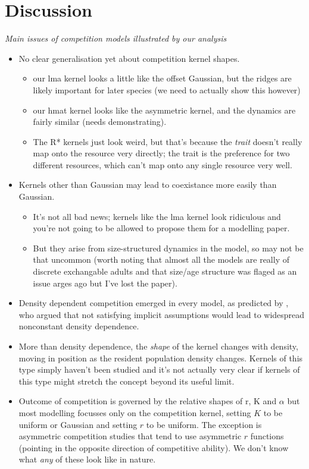 \documentclass[a4paper,11pt]{article}
\begin{document}
\clearpage
\section{Discussion}

\textit{Main issues of competition models illustrated by our analysis}
\begin{itemize}
\item No clear generalisation yet about competition kernel shapes.
  \begin{itemize}
  \item our lma kernel looks a little like the
    \citet{Roughgarden-1979} offset Gaussian, but the ridges are
    likely important for later species (we need to actually show this
    however)
  \item our hmat kernel looks like the \citet{Kisdi-1999} asymmetric
    kernel, and the dynamics are fairly similar (needs
    demonstrating).
  \item The R* kernels just look weird, but that's because the
    \emph{trait} doesn't really map onto the resource very directly;
    the trait is the preference for two different resources, which
    can't map onto any single resource very well.
  \end{itemize}
\item Kernels other than Gaussian may lead to coexistance more easily
  than Gaussian.
  \begin{itemize}
  \item It's not all bad news; kernels like the lma kernel look
    ridiculous and you're not going to be allowed to propose them for
    a modelling paper.
  \item But they arise from size-structured dynamics in the model, so
    may not be that uncommon (worth noting that almost all the models
    are really of discrete exchangable adults and that size/age
    structure was flaged as an issue arges ago but I've lost the
    paper).
  \end{itemize}
\item Density dependent competition emerged in every model, as
  predicted by \citet{Abrams-1980}, who argued that not satisfying
  implicit assumptions would lead to widespread nonconstant density
  dependence.
\item More than density dependence, the \emph{shape} of the kernel
  changes with density, moving in position as the resident population
  density changes.  Kernels of this type simply haven't been studied
  and it's not actually very clear if kernels of this type might
  stretch the concept beyond its useful limit.
\item Outcome of competition is governed by the relative shapes of r,
  K and $\alpha$ but most modelling focusses only on the competition
  kernel, setting $K$ to be uniform or Gaussian and setting $r$ to be
  uniform.  The exception is asymmetric competition studies that tend
  to use asymmetric $r$ functions (pointing in the opposite direction
  of competitive ability). We don't know what \emph{any} of these look
  like in nature.
\end{itemize}
\end{document}
